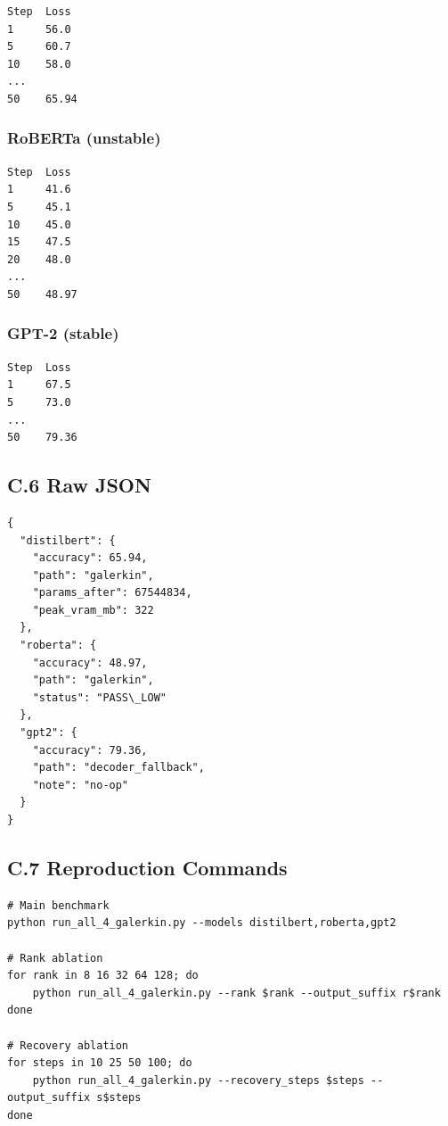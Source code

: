 \begin{lstlisting}
Step  Loss
1     56.0
5     60.7
10    58.0
...
50    65.94
\end{lstlisting}

\subsubsection{RoBERTa (unstable)}

\begin{lstlisting}
Step  Loss
1     41.6
5     45.1
10    45.0
15    47.5
20    48.0
...
50    48.97
\end{lstlisting}

\subsubsection{GPT-2 (stable)}

\begin{lstlisting}
Step  Loss
1     67.5
5     73.0
...
50    79.36
\end{lstlisting}

\subsection{C.6 Raw JSON}

\begin{lstlisting}
{
  "distilbert": {
    "accuracy": 65.94,
    "path": "galerkin",
    "params_after": 67544834,
    "peak_vram_mb": 322
  },
  "roberta": {
    "accuracy": 48.97,
    "path": "galerkin",
    "status": "PASS\_LOW"
  },
  "gpt2": {
    "accuracy": 79.36,
    "path": "decoder_fallback",
    "note": "no-op"
  }
}
\end{lstlisting}

\subsection{C.7 Reproduction Commands}

\begin{lstlisting}
# Main benchmark
python run_all_4_galerkin.py --models distilbert,roberta,gpt2

# Rank ablation
for rank in 8 16 32 64 128; do
    python run_all_4_galerkin.py --rank $rank --output_suffix r$rank
done

# Recovery ablation
for steps in 10 25 50 100; do
    python run_all_4_galerkin.py --recovery_steps $steps --output_suffix s$steps
done
\end{lstlisting}

